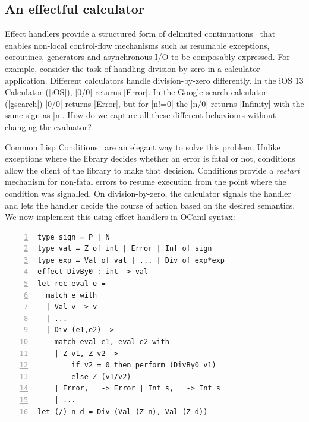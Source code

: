 \documentclass[sigplan,10pt,review,anonymous]{acmart}\settopmatter{printfolios=true,printccs=false,printacmref=false}
\begin{document}
\subsection{An effectful calculator}

Effect handlers provide a structured form of delimited
continuations~\cite{Danvy90} that enables non-local control-flow mechanisms
such as resumable exceptions, coroutines, generators and asynchronous I/O to be
composably expressed. For example, consider the task of handling
division-by-zero in a calculator application. Different calculators handle
division-by-zero differently. In the iOS 13 Calculator (|iOS|), |0/0| returns
|Error|. In the Google search calculator (|gsearch|) |0/0| returns |Error|, but
for |n!=0| the |n/0| returns |Infinity| with the same sign as |n|. How do we
capture all these different behaviours without changing the evaluator?

Common Lisp Conditions~\cite{Steele90} are an elegant way to solve this
problem. Unlike exceptions where the library decides whether an error is fatal
or not, conditions allow the client of the library to make that decision.
Conditions provide a \emph{restart} mechanism for non-fatal errors to resume
execution from the point where the condition was signalled. On
division-by-zero, the calculator signals the handler and lets the handler
decide the course of action based on the desired semantics. We now implement
this using effect handlers in OCaml syntax:

\begin{lstlisting}[numbers=left]
type sign = P | N
type val = Z of int | Error | Inf of sign
type exp = Val of val | ... | Div of exp*exp
effect DivBy0 : int -> val
let rec eval e =
  match e with
  | Val v -> v
  | ...
  | Div (e1,e2) ->
    match eval e1, eval e2 with
    | Z v1, Z v2 ->
        if v2 = 0 then perform (DivBy0 v1)
        else Z (v1/v2)
    | Error, _ -> Error | Inf s, _ -> Inf s
    | ...
let (/) n d = Div (Val (Z n), Val (Z d))
\end{lstlisting}
\end{document}
